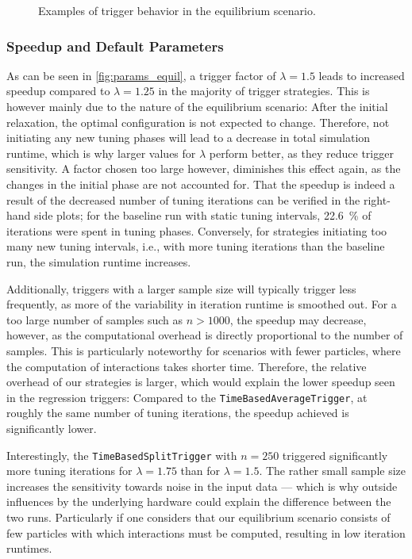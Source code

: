 \begin{figure}[htpb]
\begin{subfigure}[t]{0.5\textwidth}
		\vspace*{-1cm}
	\end{subfigure}
	\caption{Examples of trigger behavior in the equilibrium scenario.}
	\label{fig:equilibrium_trigger_behavior}
\end{figure}



\subsubsection{Speedup and Default Parameters}

As can be seen in \autoref{fig:params_equil}, a trigger factor of $\lambda=1.5$ leads to increased speedup compared to $\lambda=1.25$ in the majority of trigger strategies. This is however mainly due to the nature of the equilibrium scenario: After the initial relaxation, the optimal configuration is not expected to change.
Therefore, not initiating any new tuning phases will lead to a decrease in total simulation runtime, which is why larger values for $\lambda$ perform better, as they reduce trigger sensitivity. A factor chosen too large however, diminishes this effect again, as the changes in the initial phase are not accounted for. That the speedup is indeed  a result of the decreased number of tuning iterations can be verified in the right-hand side plots; for the baseline run with static tuning intervals, \qty{22.6}{\percent} of iterations were spent in tuning phases.
Conversely, for strategies initiating too many new tuning intervals, i.e., with more tuning iterations than the baseline run, the simulation runtime increases.

Additionally, triggers with a larger sample size will typically trigger less frequently, as more of the variability in iteration runtime is smoothed out. For a too large number of samples such as $n>1000$, the speedup may decrease, however, as the computational overhead is directly proportional to the number of samples. This is particularly noteworthy for scenarios with fewer particles, where the computation of interactions takes shorter time. Therefore, the relative overhead of our strategies is larger, which would explain the lower speedup seen in the regression triggers: Compared to the \texttt{TimeBasedAverageTrigger}, at roughly the same number of tuning iterations, the speedup achieved is significantly lower.

Interestingly, the \texttt{TimeBasedSplitTrigger} with $n=250$ triggered significantly more tuning iterations for $\lambda=1.75$ than for $\lambda=1.5$.  The rather small sample size increases the sensitivity towards noise in the input data --- which is why outside influences by the underlying hardware could explain the difference between the two runs. Particularly if one considers that our equilibrium scenario consists of few particles with which interactions must be computed, resulting in low iteration runtimes.


